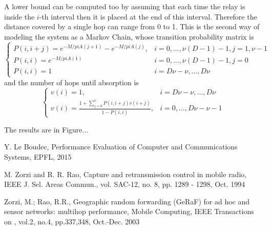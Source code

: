 \documentclass[10pt]{article}
\begin{document}
A lower bound can be computed too by assuming that each time the relay is inside the $i$-th interval then it is placed at the end of this interval. Therefore the distance covered by a single hop can range from 0 to 1. This is the second way of modeling the system as a Markov Chain, whose transition probability matrix is
\begin{equation}
\begin{cases}
  P(i, i + j) = e^{-M/pi A(j+1)} - e^{-M/pi A(j)}, & i = 0, \dots, \nu (D - 1) - 1, j = 1, \nu-1 \\
  P(i, i) = e^{-M/pi A(1)} & i = 0, \dots, \nu (D - 1) - 1, j = 0 \\
  P(i, i) = 1 & i = D\nu - \nu, \dots, D\nu 
\end{cases}
\end{equation}
and the number of hops until absorption is
\begin{equation}
\begin{cases}
  v(i) = 1, & i = D\nu - \nu , \dots, D\nu  \\
  v(i) = \frac{1+\sum_{j = 0}^{\nu} P(i, i + j) v(i + j)}{1-P(i, i)}, & i = 0, \dots, D\nu - \nu - 1
\end{cases}
\end{equation}

The results are in Figure... 

\begin{thebibliography}{10}

Y. Le Boudec, Performance Evaluation of Computer and Communications Systems, EPFL, 2015

M. Zorzi and R. R. Rao, Capture and retransmission control in
mobile radio, IEEE J. Sel. Areas Commun., vol. SAC-12, no. 8, pp.
1289 - 1298, Oct. 1994

Zorzi, M.; Rao, R.R., Geographic random forwarding (GeRaF) for ad hoc and sensor networks: multihop performance, Mobile Computing, IEEE Transactions on , vol.2, no.4, pp.337,348, Oct.-Dec. 2003


\end{thebibliography}
\end{document}
